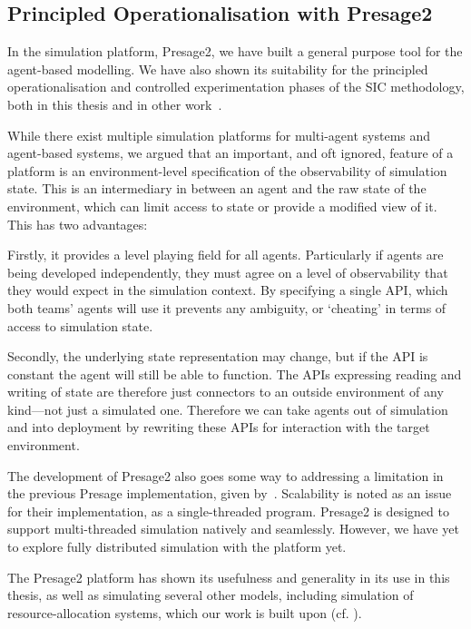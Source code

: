 \subsection{Principled Operationalisation with Presage2}

In the simulation platform, Presage2, we have built a general purpose tool for
the agent-based modelling. We have also shown its suitability for the
principled operationalisation and controlled experimentation phases of the
\ac{SIC} methodology, both in this thesis and in other
work~\citep{Macbeth2014}.

While there exist multiple simulation platforms for multi-agent systems and
agent-based systems, we argued that an important, and oft ignored, feature of
a platform is an environment-level specification of the observability of
simulation state. This is an intermediary in between an agent and the raw
state of the environment, which can limit access to state or provide a modified view of it.
This has two advantages:

Firstly, it provides a level playing field for all agents. Particularly if
agents are being developed independently, they must agree on a level of
observability that they would expect in the simulation context. By specifying a
single \ac{API}, which both teams' agents will use it prevents any ambiguity,
or `cheating' in terms of access to simulation state.

Secondly, the underlying state representation may change, but if the \ac{API}
is constant the agent will still be able to function. The \acp{API} expressing
reading and writing of state are therefore just connectors to an outside
environment of any kind---not just a simulated one. Therefore we can take
agents out of simulation and into deployment by rewriting these \acp{API} for
interaction with the target environment.

The development of Presage2 also goes some way to addressing a limitation in
the previous Presage implementation, given by~\citet{Neville2011}. Scalability is noted as an issue for their implementation, as a single-threaded
program. Presage2 is designed to support multi-threaded simulation natively
and seamlessly. However, we have yet to explore fully distributed simulation
with the platform yet.

The Presage2 platform has shown its usefulness and generality in its use in
this thesis, as well as simulating several other models, including simulation
of resource-allocation systems, which our work is built upon (cf.
\citet{Schaumeier2013,Pitt2014}).

